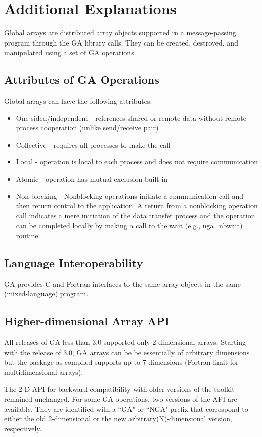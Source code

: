 \documentclass[12pt]{article}
\begin{document}
\section{Additional Explanations}

Global arrays are distributed array objects supported in a message-passing program through the GA library calls. They can be created, destroyed, and manipulated using a set of GA operations.

\subsection{Attributes of GA Operations}

Global arrays can have the following attributes.

\begin{itemize}
\item One-sided/independent - references shared or remote data without remote process cooperation (unlike send/receive pair)
\item Collective - requires all processes to make the call
\item Local - operation is local to each process and does not require communication
\item Atomic - operation has mutual exclusion built in 
\item Non-blocking - Nonblocking operations initiate a communication call and then return control to the application. A return from a nonblocking operation call indicates a mere initiation of the data transfer process and the operation can be completed locally by making a call to the wait (e.g., nga_nbwait) routine.
\end{itemize}
 
\subsection{Language Interoperability}

GA provides C and Fortran interfaces  to the same array objects in the same (mixed-language) program.

\subsection{Higher-dimensional Array API}

All releases of GA less than 3.0 supported only 2-dimensional arrays. Starting with the release of 3.0, GA arrays can be be essentially of arbitrary dimensions but the package as compiled supports up to 7 dimensions (Fortran limit for multidimensional arrays).

The 2-D API for backward compatibility with older versions of the toolkit remained unchanged. For some GA operations, two versions of the API are available. They are identified with a ``GA" or ``NGA" prefix that correspond to either the old 2-dimensional or the new arbitrary(N)-dimensional version, respectively. 
\end{document}
